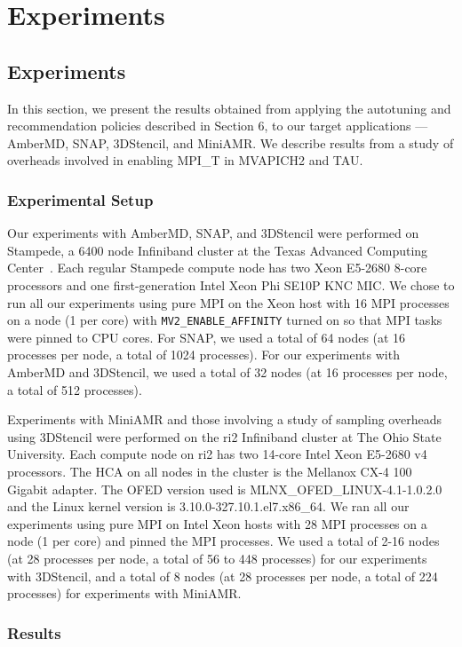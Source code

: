 \chapter{Experiments}
\section{Experiments}
In this section, we present the results obtained from applying the autotuning and recommendation policies described in Section 6, to our target applications --- AmberMD, SNAP, 3DStencil, and MiniAMR. We describe results from a study of overheads involved in enabling MPI\_T in MVAPICH2 and TAU.

\subsection{Experimental Setup}
Our experiments with AmberMD, SNAP, and 3DStencil were performed on Stampede, a 6400 node Infiniband cluster at the Texas Advanced Computing Center~\cite{TACC}. Each regular Stampede compute node has two Xeon E5-2680 8-core  processors and one first-generation Intel Xeon Phi SE10P KNC MIC. We chose to run all our experiments using pure MPI on the Xeon host with 16 MPI processes on a node (1 per core) with \verb+MV2_ENABLE_AFFINITY+ turned on so that MPI tasks were pinned to CPU cores. For SNAP, we used a total of 64 nodes (at 16 processes per node, a total of 1024 processes). For our experiments with AmberMD and 3DStencil, we used a total of 32 nodes (at 16 processes per node, a total of 512 processes). \par
Experiments with MiniAMR and those involving a study of sampling overheads using 3DStencil were performed on the ri2 Infiniband cluster at The Ohio State University. Each compute node on ri2 has two 14-core Intel Xeon E5-2680 v4 processors. The HCA on all nodes in the cluster is the Mellanox CX-4 100 Gigabit adapter. The OFED version used is MLNX\_OFED\_LINUX-4.1-1.0.2.0 and the Linux kernel version is 3.10.0-327.10.1.el7.x86\_64. We ran all our experiments using pure MPI on Intel Xeon hosts with 28 MPI processes on a node (1 per core) and pinned the MPI processes. We used a total of 2-16 nodes (at 28 processes per node, a total of 56 to 448 processes) for our experiments with 3DStencil, and a total of 8 nodes (at 28 processes per node, a total of 224 processes) for experiments with MiniAMR.

\subsection{Results}

